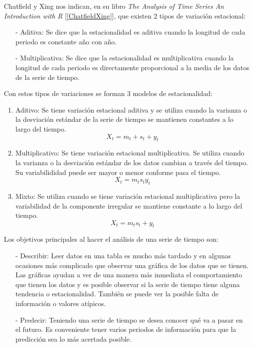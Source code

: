 Chatfield y Xing nos indican, en su libro \textit{The Analysis of Time Series An Introduction with R} [\ref{ChatfieldXing}], que existen 2 tipos de variación estacional:

\begin{itemize}
\item[-] Aditiva: Se dice que la estacionalidad es aditiva cuando la longitud de cada periodo es constante año con año.

\item[-] Multiplicativa: Se dice que la estacionalidad es multiplicativa cuando la longitud de cada periodo es directamente proporcional a la media de los datos de la serie de tiempo.
\end{itemize}

Con estos tipos de variaciones se forman 3 modelos de estacionalidad:

\begin{enumerate}
\item Aditivo: Se tiene variación estacional aditiva y se utiliza cuando la varianza o la desviación estándar de la serie de tiempo se mantienen constantes a lo largo del tiempo.
\begin{equation}
X_{t} = m_{t} + s_{t} + y_{t}
\end{equation}

\item Multiplicativo: Se tiene variación estacional multiplicativa. Se utiliza cuando la varianza o la desviación estándar de los datos cambian a través del tiempo. Su variabilididad puede ser mayor o menor conforme pasa el tiempo.
\begin{equation}
X_{t} = m_{t}s_{t}y_{t}
\end{equation}

\item Mixto: Se utiliza cuando se tiene variación estacional multiplicativa pero la variabilidad de la componente irregular se mantiene constante a lo largo del tiempo.
\begin{equation}
X_{t} = m_{t}s_{t} + y_{t}
\end{equation}
\end{enumerate}

Los objetivos principales al hacer el análisis de una serie de tiempo son:

\begin{itemize}
\item[-] Describir: Leer datos en una tabla es mucho más tardado y en algunas ocasiones más complicado que observar una gráfica de los datos que se tienen. Las gráficas ayudan a ver de una manera más inmediata el comportamiento que tienen los datos y es posible observar si la serie de tiempo tiene alguna tendencia o estacionalidad. También se puede ver la posible falta de información o valores atípicos.

\item[-] Predecir: Teniendo una serie de tiempo se desea conocer qué va a pasar en el futuro. Es conveniente tener varios periodos de información para que la predicción sea lo más acertada posible.
\end{itemize}

